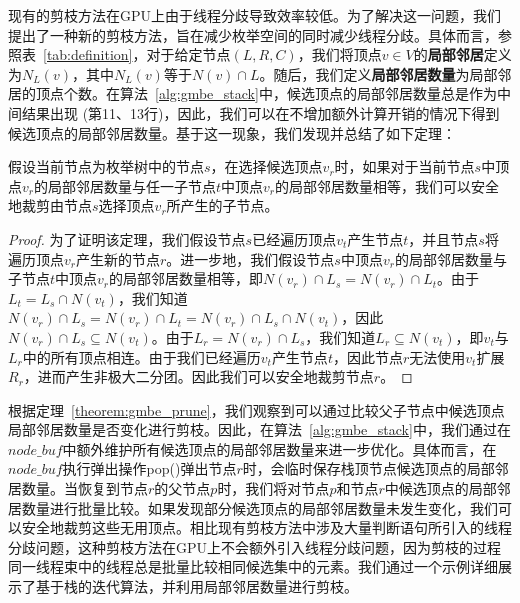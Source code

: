 现有的剪枝方法在GPU上由于线程分歧导致效率较低。为了解决这一问题，我们提出了一种新的剪枝方法，旨在减少枚举空间的同时减少线程分歧。具体而言，参照表~\ref{tab:definition}，对于给定节点$(L, R, C)$，我们将顶点$v \in V$的\textbf{局部邻居}定义为$N_L(v)$，其中$N_L(v)$等于$N(v) \cap L$。随后，我们定义\textbf{局部邻居数量}为局部邻居的顶点个数。在算法~\ref{alg:gmbe_stack}中，候选顶点的局部邻居数量总是作为中间结果出现  (第11、13行)，因此，我们可以在不增加额外计算开销的情况下得到候选顶点的局部邻居数量。基于这一现象，我们发现并总结了如下定理：

\begin{theorem}
  假设当前节点为枚举树中的节点$s$，在选择候选顶点$v_r$时，如果对于当前节点$s$中顶点$v_r$的局部邻居数量与任一子节点$t$中顶点$v_r$的局部邻居数量相等，我们可以安全地裁剪由节点$s$选择顶点$v_r$所产生的子节点。
  \label{theorem:gmbe_prune}
\end{theorem}

\begin{proof}
  为了证明该定理，我们假设节点$s$已经遍历顶点$v_t$产生节点$t$，并且节点$s$将遍历顶点$v_r$产生新的节点$r$。进一步地，我们假设节点$s$中顶点$v_r$的局部邻居数量与子节点$t$中顶点$v_r$的局部邻居数量相等，即$N(v_r) \cap L_s =N(v_r) \cap L_t$。由于$L_t = L_s\cap N(v_t)$，我们知道$N(v_r) \cap L_s =N(v_r) \cap L_t= N(v_r) \cap L_s\cap N(v_t)$，因此$N(v_r) \cap L_s \subseteq N(v_t)$。由于$L_r = N(v_r)\cap L_s$，我们知道$L_r\subseteq N(v_t)$，即$v_t$与$L_r$中的所有顶点相连。由于我们已经遍历$v_t$产生节点$t$，因此节点$r$无法使用$v_t$扩展$R_r$，进而产生非极大二分团。因此我们可以安全地裁剪节点$r$。

\end{proof}

根据定理~\ref{theorem:gmbe_prune}，我们观察到可以通过比较父子节点中候选顶点局部邻居数量是否变化进行剪枝。因此，在算法~\ref{alg:gmbe_stack}中，我们通过在$node\_buf$中额外维护所有候选顶点的局部邻居数量来进一步优化。具体而言，在$node\_buf$执行弹出操作\textsf{pop()}弹出节点$r$时，会临时保存栈顶节点候选顶点的局部邻居数量。当恢复到节点$r$的父节点$p$时，我们将对节点$p$和节点$r$中候选顶点的局部邻居数量进行批量比较。如果发现部分候选顶点的局部邻居数量未发生变化，我们可以安全地裁剪这些无用顶点。相比现有剪枝方法中涉及大量判断语句所引入的线程分歧问题，这种剪枝方法在GPU上不会额外引入线程分歧问题，因为剪枝的过程同一线程束中的线程总是批量比较相同候选集中的元素。我们通过一个示例详细展示了基于栈的迭代算法，并利用局部邻居数量进行剪枝。












